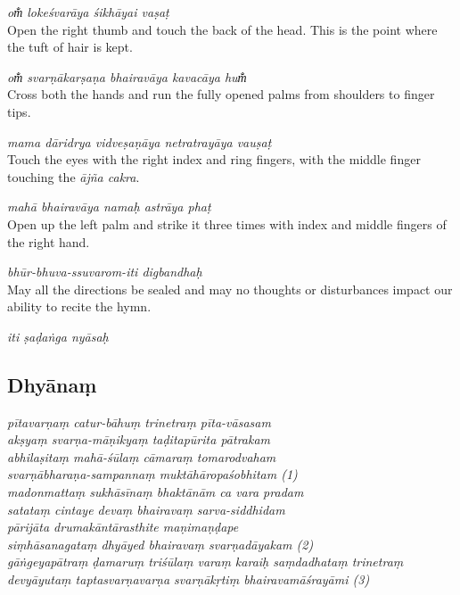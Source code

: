 \documentclass[12pt,oneside,a4paper]{article}
\newenvironment{shloka}[1]
  {\bigskip\center#1\varwidth{\linewidth}}
  {\endvarwidth\endcenter\bigskip}
\newcommand{\tl}[1]{\emph{#1}}
\begin{document}
\tl{om̐ lokeśvarāya śikhāyai vaṣaṭ}\\
Open the right thumb and touch the back of the head. This is the point where
the tuft of hair is kept.

\tl{om̐ svarṇākarṣaṇa bhairavāya kavacāya hum̐}\\
Cross both the hands and run the fully opened palms from shoulders to finger
tips.

\tl{mama dāridrya vidveṣaṇāya netratrayāya vauṣaṭ}\\
Touch the eyes with the right index and ring fingers, with the middle finger
touching the \tl{ājña cakra}.

\tl{mahā bhairavāya namaḥ astrāya phaṭ}\\
Open up the left palm and strike it three times with index and middle fingers
of the right hand.

\tl{bhūr-bhuva-ssuvarom-iti digbandhaḥ}\\
May all the directions be sealed and may no thoughts or disturbances impact our
ability to recite the hymn.

\begin{shloka}\itshape
  iti ṣaḍaṅga nyāsaḥ
\end{shloka}

\subsection{Dhyānaṃ}

\begin{shloka}\itshape
  pītavarṇaṃ catur-bāhuṃ trinetraṃ pīta-vāsasam\\
  akṣyaṃ svarṇa-māṇikyaṃ taḍitapūrita pātrakam\\
  abhilaṣitaṃ mahā-śūlaṃ cāmaraṃ tomarodvaham\\
  svarṇābharaṇa-sampannaṃ muktāhāropaśobhitam (1)\\

  madonmattaṃ sukhāsīnaṃ bhaktānām ca vara pradam\\
  satataṃ cintaye devaṃ bhairavaṃ sarva-siddhidam\\
  pārijāta drumakāntārasthite maṇimaṇḍape\\
  siṃhāsanagataṃ dhyāyed bhairavaṃ svarṇadāyakam (2)\\

  gāṅgeyapātraṃ ḍamaruṃ triśūlaṃ varaṃ karaiḥ saṃdadhataṃ trinetraṃ\\
  devyāyutaṃ taptasvarṇavarṇa svarṇākṛtiṃ bhairavamāśrayāmi (3)\\
\end{shloka}
\end{document}
